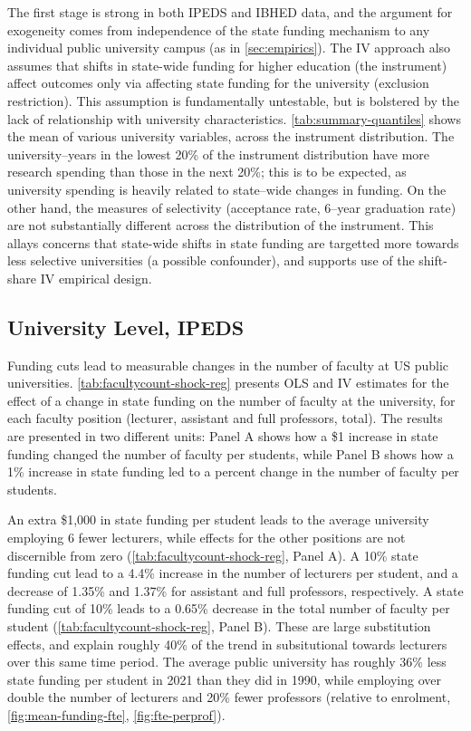 The first stage is strong in both IPEDS and IBHED data, and the argument for exogeneity comes from independence of the state funding mechanism to any individual public university campus (as in \autoref{sec:empirics}).
The IV approach also assumes that shifts in state-wide funding for higher education (the instrument) affect outcomes only via affecting state funding for the university (exclusion restriction).
This assumption is fundamentally untestable, but is bolstered by the lack of relationship with university characteristics.
\autoref{tab:summary-quantiles} shows the mean of various university variables, across the instrument distribution.
The university--years in the lowest 20\% of the instrument distribution have more research spending than those in the next 20\%; this is to be expected, as university spending is heavily related to state--wide changes in funding.
On the other hand, the measures of selectivity (acceptance rate, 6--year graduation rate) are not substantially different across the distribution of the instrument.
This allays concerns that state-wide shifts in state funding are targetted more towards less selective universities (a possible confounder), and supports use of the shift-share IV empirical design.

\subsection{University Level, IPEDS}
\label{sec:results-ipeds}
Funding cuts lead to measurable changes in the number of faculty at US public universities.
\autoref{tab:facultycount-shock-reg} presents OLS and IV estimates for the effect of a change in state funding on the number of faculty at the university, for each faculty position (lecturer, assistant and full professors, total).
The results are presented in two different units: Panel A shows how a \$1 increase in state funding changed the number of faculty per students, while Panel B shows how a 1\% increase in state funding led to a percent change in the number of faculty per students.

An extra \$1,000 in state funding per student leads to the average university employing 6 fewer lecturers, while effects for the other positions are not discernible from zero (\autoref{tab:facultycount-shock-reg}, Panel A).
A 10\% state funding cut lead to a 4.4\% increase in the number of lecturers per student, and a decrease of 1.35\% and 1.37\% for assistant and full professors, respectively.
A state funding cut of 10\% leads to a 0.65\% decrease in the total number of faculty per student (\autoref{tab:facultycount-shock-reg}, Panel B).
These are large substitution effects, and explain roughly 40\% of the trend in subsitutional towards lecturers over this same time period.
The average public university has roughly 36\% less state funding per student in 2021 than they did in 1990, while employing over double the number of lecturers and 20\% fewer professors (relative to enrolment, \autoref{fig:mean-funding-fte}, \ref{fig:fte-perprof}).

